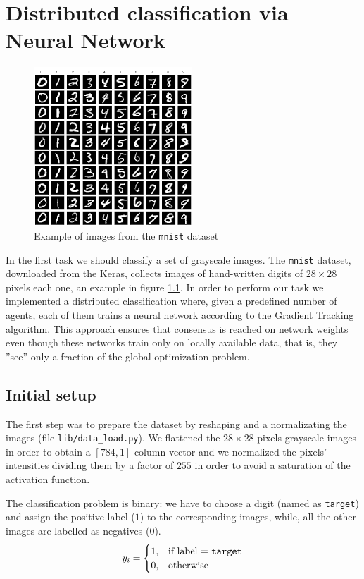 \documentclass[a4paper,11pt,oneside]{book}
\begin{document}
\chapter{Distributed classification via Neural Network}

\begin{figure}
	\centering
	\includegraphics[scale=0.5]{mnist}
	\caption{Example of images from the \texttt{mnist} dataset}
	\label{mnist}
\end{figure}


In the first task we should classify a set of grayscale images. The \texttt{mnist} dataset, downloaded from the Keras, collects images of hand-written digits of $28\times28$ pixels each one, an example in figure \ref{mnist}. In order to perform our task we implemented a distributed classification where, given a predefined number of agents, each of them trains a neural network according to the Gradient Tracking algorithm. This approach ensures that consensus is reached on network weights even though these networks train only on locally available data, that is, they ''see'' only a fraction of the global optimization problem.

\section{Initial setup}
The first step was to prepare the dataset by reshaping and a normalizating the images (file \texttt{lib/data\_load.py}). We flattened the $28\times28$ pixels grayscale images in order to obtain a $[784,1]$ column vector and we normalized the pixels' intensities dividing them by a factor of $255$ in order to avoid a saturation of the activation function.

The classification problem is binary: we have to choose a digit (named as \texttt{target}) and assign the positive label ($1$) to the corresponding images, while, all the other images are labelled as negatives ($0$).
\begin{equation}
y_i = 
\begin{cases}
1, & \text{if label = \texttt{target}} \\
0, & \text{otherwise}
\end{cases}
\end{equation}
\end{document}
